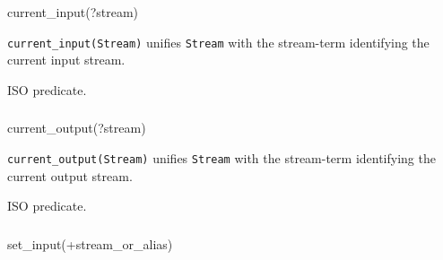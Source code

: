 \subsubsection{}

\begin{TemplatesOneCol}
current\_input(?stream)

\end{TemplatesOneCol}

\Description

\texttt{current\_input(Stream)} unifies \texttt{Stream} with the stream-term
identifying the current input stream.

\begin{PlErrors}


\end{PlErrors}

\Portability

ISO predicate.

\subsubsection{}

\begin{TemplatesOneCol}
current\_output(?stream)

\end{TemplatesOneCol}

\Description

\texttt{current\_output(Stream)} unifies \texttt{Stream} with the
stream-term identifying the current output stream.

\begin{PlErrors}


\end{PlErrors}

\Portability

ISO predicate.

\subsubsection{\label{set-input/1}}

\begin{TemplatesOneCol}
set\_input(+stream\_or\_alias)

\end{TemplatesOneCol}

